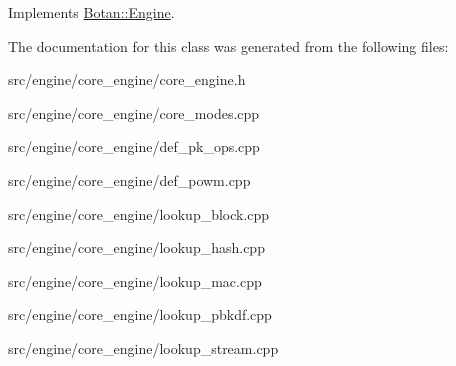 Implements \hyperlink{classBotan_1_1Engine_a4c2c3ed7b3a2995e6cb8c238346b3a50}{Botan\-::\-Engine}.



The documentation for this class was generated from the following files\-:\begin{DoxyCompactItemize}
\item 
src/engine/core\-\_\-engine/core\-\_\-engine.\-h\item 
src/engine/core\-\_\-engine/core\-\_\-modes.\-cpp\item 
src/engine/core\-\_\-engine/def\-\_\-pk\-\_\-ops.\-cpp\item 
src/engine/core\-\_\-engine/def\-\_\-powm.\-cpp\item 
src/engine/core\-\_\-engine/lookup\-\_\-block.\-cpp\item 
src/engine/core\-\_\-engine/lookup\-\_\-hash.\-cpp\item 
src/engine/core\-\_\-engine/lookup\-\_\-mac.\-cpp\item 
src/engine/core\-\_\-engine/lookup\-\_\-pbkdf.\-cpp\item 
src/engine/core\-\_\-engine/lookup\-\_\-stream.\-cpp\end{DoxyCompactItemize}
